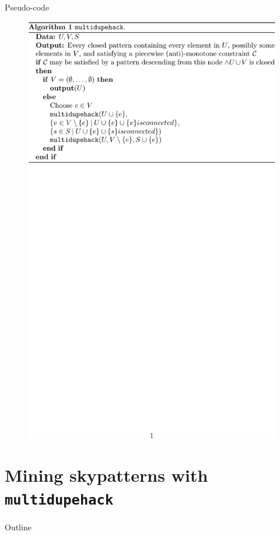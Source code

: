 \documentclass{beamer}
\newcommand{\mdh}{\texttt{multi\-dupe\-hack}}
\begin{document}
\begin{frame}{Pseudo-code}
  \begin{figure}[htp]
  \centering
  \includegraphics[width=\textwidth]{pseudocode-mdh-crop.pdf}
  \end{figure}
\end{frame}


\section{Mining skypatterns with \mdh{}}
\begin{frame}{Outline}
  \tableofcontents[currentsection]
\end{frame}
\end{document}

